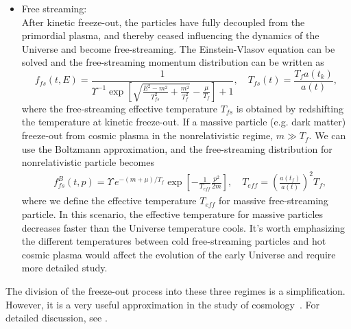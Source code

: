 \begin{itemize}
\item{Free streaming:}\\
After kinetic freeze-out, the particles have fully decoupled from the primordial plasma, and thereby ceased influencing the dynamics of the Universe and become free-streaming. The Einstein-Vlasov equation can be solved \cite{Choquet-Bruhat:2009xil} and the free-streaming momentum distribution can be written as \cite{Birrell:2012gg}
\begin{equation}\label{free_stream_dist}
f_{fs}(t,E)=\frac{1}{\Upsilon^{-1}\exp{\left[\sqrt{\frac{E^2-m^2}{T_{fs}^2}+\frac{m^2}{T^2_f}}-\frac{\mu}{T_f}\right]+1}},\quad T_{fs}(t)=\frac{T_fa(t_k)}{a(t)},
\end{equation}
where the free-streaming effective temperature $T_{fs}$ is obtained by redshifting the temperature at kinetic freeze-out. If a massive particle (e.g. dark matter) freeze-out from cosmic plasma in the nonrelativistic regime, $m\gg T_f$. We can use the
Boltzmann approximation, and the free-streaming distribution for nonrelativistic particle becomes
\begin{align}
&f^B_{fs}(t,p)=\Upsilon\,e^{-(m+\mu)/T_f}\exp\left[-\frac{1}{ T_{eff}}\frac{p^2}{2m}\right],\quad T_{eff}=\left(\frac{a(t_f)}{a(t)}\right)^2T_f,
\end{align}
where we define the effective temperature $T_{eff}$ for massive free-streaming particle. In this scenario, the effective temperature for massive particles decreases faster than the Universe temperature cools. It's worth emphasizing the different temperatures between cold free-streaming particles and hot cosmic plasma would affect the evolution of the early Universe and require more detailed study. 
\end{itemize}

The division of the freeze-out process into these three regimes is a simplification. However, it is a very useful approximation in the study of cosmology~\cite{Mangano:2005cc,Birrell:2014gea}. For detailed discussion, see \cite{Birrell:2012gg,Rafelski:2023emw}.
